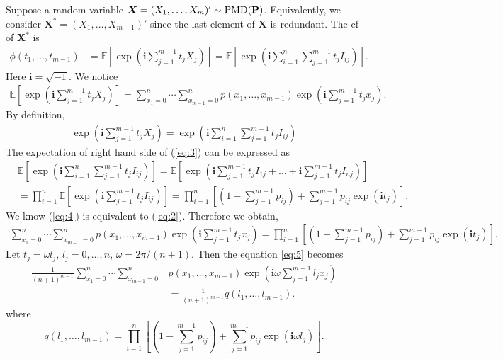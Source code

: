 \documentclass[12pt]{article}
\newcommand{\EE}{\mathbb{E}}
\newcommand{\Pmat}{\mathbf{P}}
\newcommand{\ivec}{{\boldsymbol{i}}}
\newcommand{\PMD}{{\normalfont\textrm{PMD}}}
\newcommand{\Xvec}{\boldsymbol{X}}
\begin{document}
Suppose a random variable $\Xvec =  (X_1, \dots, X_{m})' \sim \PMD(\Pmat)$. Equivalently, we consider $\Xvec^{\ast} = (X_1, \dots, X_{m-1})'$ since the last element of $\Xvec$ is redundant. The cf of $\Xvec^{\ast}$ is
\begin{align}
\phi(t_1, \dots, t_{m-1}) & = \EE\left[\exp\left(\ivec\sum_{j=1}^{m-1}t_jX_j\right)\right]=\EE\left[\exp\left(\ivec\sum_{i = 1}^n \sum_{j=1}^{m-1}t_j I_{ij}\right)\right].
\end{align}
Here $\ivec=\sqrt{-1}$. We notice
\begin{align}\label{eq:2}
\EE\left[\exp\left(\ivec\sum_{j=1}^{m-1}t_jX_j\right)\right] = \sum_{x_1 = 0}^{n}\cdots \sum_{x_{m-1} = 0}^n p(x_1,\ldots,x_{m-1})\exp\left(\ivec\sum_{j=1}^{m-1}t_jx_j\right).
\end{align}
By definition,
\begin{align}\label{eq:3}
\exp\left(\ivec\sum_{j=1}^{m-1}t_jX_j\right)= \exp\left(\ivec\sum_{i = 1}^n \sum_{j=1}^{m-1}t_j I_{ij}\right)
\end{align}
The expectation of right hand side of (\ref{eq:3}) can be expressed as
\begin{align}\label{eq:4}
&\EE\left[\exp\left(\ivec\sum_{i = 1}^n \sum_{j=1}^{m-1}t_j I_{ij}\right)\right] = \EE\left[ \exp\left( \ivec\sum_{j=1}^{m-1} t_jI_{1j} + \dots + \ivec\sum_{j=1}^{m-1} t_jI_{nj}\right)\right]\\\nonumber
& = \prod_{i=1}^n \EE\left[ \exp\left( \ivec \sum_{j=1}^{m-1} t_j I_{ij}\right)\right] = \prod_{i=1}^n \left[(1 - \sum_{j=1}^{m-1}p_{ij})+\sum_{j=1}^{m-1}p_{ij}\exp(\ivec t_j)\right].
\end{align}
We know (\ref{eq:4}) is equivalent to (\ref{eq:2}). Therefore we obtain,
\begin{align}\label{eq:5}
\sum_{x_1 = 0}^{n}\cdots \sum_{x_{m-1} = 0}^n p(x_1,\ldots,x_{m-1})\exp\left(\ivec\sum_{j=1}^{m-1}t_jx_j\right)= \prod_{i=1}^{n}\left[(1 - \sum_{j=1}^{m-1}p_{ij})+\sum_{j=1}^{m-1}p_{ij}\exp(\ivec t_j)\right].
\end{align}
Let $t_j = \omega l_j$, $l_j = 0, \ldots, n$, $\omega = 2\pi/(n+1)$. Then the equation \eqref{eq:5} becomes
\begin{align}\label{eq:6}
\frac{1}{(n+1)^{m-1}} \sum_{x_1 = 0}^{n}\cdots \sum_{x_{m-1} = 0}^n & p(x_1,\ldots,x_{m-1}) \exp\left(\ivec\omega\sum_{j=1}^{m-1}l_j x_j\right)\\\nonumber
&= \frac{1}{(n+1)^{m-1}} q(l_1, \ldots, l_{m-1}).
\end{align}
where
$$
q(l_1, \ldots, l_{m-1})=\prod_{i=1}^{n}\left[(1 - \sum_{j=1}^{m-1}p_{ij})+\sum_{j=1}^{m-1}p_{ij}\exp(\ivec \omega l_j)\right].
$$	
\end{document}
